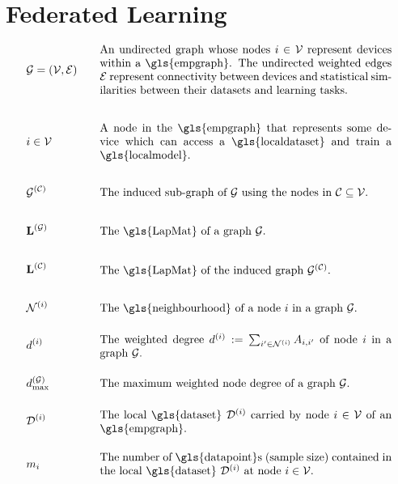 \newpage
\section*{Federated Learning}

\begin{align}
 	&\graph = \pair{\nodes}{\edges} & \quad & \parbox{.75\textwidth}{An undirected graph whose nodes $\nodeidx \in \nodes$ represent 
	devices within a \gls{empgraph}. The undirected weighted edges $\edges$ represent connectivity between 
	devices and statistical similarities between their datasets and learning tasks.} \nonumber \\[7mm]
&\nodeidx \in \nodes& \quad & \parbox{.75\textwidth}{A node in the \gls{empgraph} that represents some 
	device which can access a \gls{localdataset} and train a \gls{localmodel}.} \nonumber \\[6mm]
	&\indsubgraph{\graph}{\cluster}& \quad & \parbox{.75\textwidth}{The induced sub-graph of $\graph$ using the nodes in $\cluster \subseteq \nodes$.} \nonumber \\[6mm]
	&\LapMat{\graph}   & \quad & \parbox{.75\textwidth}{The \gls{LapMat} of a graph $\graph$.} \nonumber \\[6mm]
		&\LapMat{\cluster}   & \quad & \parbox{.75\textwidth}{The \gls{LapMat} of the induced graph $\indsubgraph{\graph}{\cluster}$.} \nonumber \\[6mm]
	 &		\neighbourhood{\nodeidx}  & \quad & \parbox{.75\textwidth}{The \gls{neighbourhood} of a node $\nodeidx$ in a graph $\graph$.}    \nonumber   \\[4mm] 
	&\nodedegree{\nodeidx} & \quad & \parbox{.75\textwidth}{The weighted degree $\nodedegree{\nodeidx}\defeq \sum_{\nodeidx' \in \neighbourhood{\nodeidx}} \edgeweight_{\nodeidx,\nodeidx'}$ of node $\nodeidx$ in a graph $\graph$.}  \nonumber   \\[4mm] 
	&\maxnodedegree^{(\graph)} & \quad & \parbox{.75\textwidth}{The maximum weighted node degree of a graph $\graph$.} \nonumber\\[4mm] 
&\localdataset{\nodeidx} & \quad & \parbox{.75\textwidth}{The local \gls{dataset} $\localdataset{\nodeidx}$ carried by 
			node $\nodeidx\in \nodes$ of an \gls{empgraph}.} \nonumber \\[4mm]
&\localsamplesize{\nodeidx} & \quad & \parbox{.75\textwidth}{The number of \gls{datapoint}s (sample size) contained in the 
			local \gls{dataset} $\localdataset{\nodeidx}$ at node $\nodeidx\in \nodes$.} \nonumber 
\end{align} 
